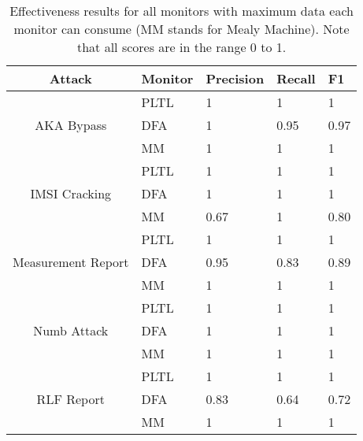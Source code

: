 \begin{table}[]
	\centering

	\begin{tabular}{|c|l|l|l|l|}
		\hline
		\textbf{Attack}                         & \textbf{Monitor} & \textbf{Precision} & \textbf{Recall} & \textbf{F1} \\ \hline
		\multirow{3}{*}{AKA Bypass}             & PLTL             & 1                  & 1               & 1           \\ \cline{2-5}
		& DFA              & 1                  & 0.95            & 0.97       \\ \cline{2-5}
		& MM               & 1                  & 1               & 1           \\ \hline
		\multirow{3}{*}{IMSI Cracking}          & PLTL             & 1                  & 1               & 1           \\ \cline{2-5}
		& DFA              & 1                  & 1               & 1           \\ \cline{2-5}
		& MM               & 0.67              & 1               & 0.80       \\ \hline
		\multirow{3}{*}{Measurement Report}     & PLTL             & 1                  & 1               & 1           \\ \cline{2-5}
		& DFA              & 0.95              & 0.83           & 0.89       \\ \cline{2-5}
		& MM               & 1                  & 1               & 1           \\ \hline
		\multirow{3}{*}{Numb Attack}            & PLTL             & 1                  & 1               & 1           \\ \cline{2-5}
		& DFA              & 1                  & 1               & 1           \\ \cline{2-5}
		& MM               & 1                  & 1               & 1           \\ \hline
		\multirow{3}{*}{RLF Report}             & PLTL             & 1                  & 1               & 1           \\ \cline{2-5}
		& DFA              & 0.83              & 0.64           & 0.72       \\ \cline{2-5}
		& MM               & 1                  & 1               & 1           \\ \hline
	\end{tabular}
	\caption{Effectiveness results for all monitors with maximum data each monitor can consume (MM stands for Mealy Machine). Note that all scores are in the range 0 to 1.}
	\label{tab:effectiveness_max_data}
\end{table}

